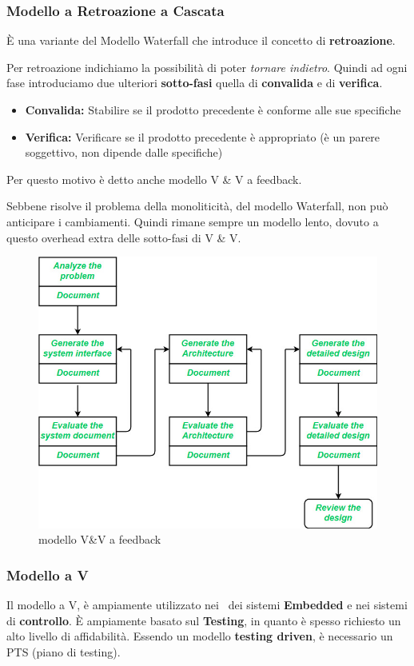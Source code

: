 \subsubsection{Modello a Retroazione a Cascata}
\`E una variante del Modello Waterfall che introduce il concetto di \textbf{retroazione}.

Per retroazione indichiamo la possibilit\`a di poter \emph{tornare indietro}.
Quindi ad ogni fase introduciamo due ulteriori \textbf{sotto-fasi} quella di \textbf{convalida} e di \textbf{verifica}.
\begin{itemize}
    \item \textbf{Convalida:}
        Stabilire se il prodotto precedente \`e conforme alle sue specifiche
    \item \textbf{Verifica:}
        Verificare se il prodotto precedente \`e appropriato (\`e un parere {soggettivo}, non dipende dalle specifiche)
\end{itemize}
Per questo motivo \`e detto anche modello V \& V a feedback.

Sebbene risolve il problema della monoliticit\`a, del modello Waterfall, non pu\`o anticipare i cambiamenti. Quindi rimane sempre un modello lento, dovuto a questo overhead extra delle sotto-fasi di V \& V.
\begin{figure}[htpb]
    \centering
    \includegraphics[scale=0.5]{feedback.jpg}
    \caption{modello V\&V a feedback}
    \label{fig:feedback}
\end{figure}
\newpage
\subsubsection{Modello a V}
Il modello a V, \`e ampiamente utilizzato nei \Sw\ dei sistemi \textbf{Embedded} e
nei sistemi di \textbf{controllo}.
\`E ampiamente basato sul \textbf{Testing}, in quanto \`e spesso richiesto un alto livello di affidabilit\`a.
Essendo un modello \textbf{testing driven}, \`e necessario un PTS (piano di testing).

